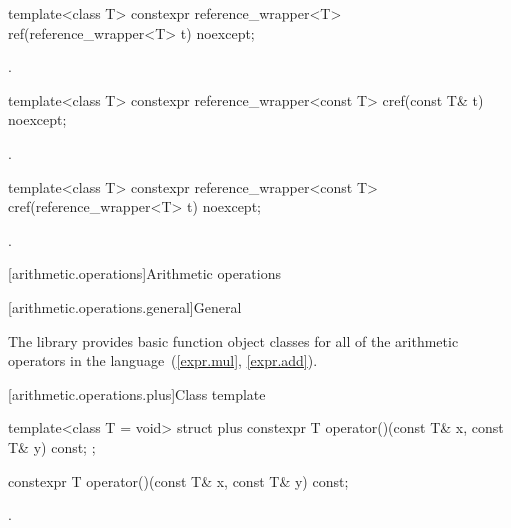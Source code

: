 %
\begin{itemdecl}
template<class T> constexpr reference_wrapper<T> ref(reference_wrapper<T> t) noexcept;
\end{itemdecl}

\begin{itemdescr}
\pnum
\returns
{}.
\end{itemdescr}

%
\begin{itemdecl}
template<class T> constexpr reference_wrapper<const T> cref(const T& t) noexcept;
\end{itemdecl}

\begin{itemdescr}
\pnum
\returns
{}.
\end{itemdescr}

%
\begin{itemdecl}
template<class T> constexpr reference_wrapper<const T> cref(reference_wrapper<T> t) noexcept;
\end{itemdecl}

\begin{itemdescr}
\pnum
\returns
{}.
\end{itemdescr}

[arithmetic.operations]{Arithmetic operations}

[arithmetic.operations.general]{General}

\pnum
The library provides basic function object classes for all of the arithmetic
operators in the language~(\ref{expr.mul}, \ref{expr.add}).

[arithmetic.operations.plus]{Class template }

%
\begin{itemdecl}
template<class T = void> struct plus {
  constexpr T operator()(const T& x, const T& y) const;
};
\end{itemdecl}

%
\begin{itemdecl}
constexpr T operator()(const T& x, const T& y) const;
\end{itemdecl}

\begin{itemdescr}
\pnum
\returns
{}.
\end{itemdescr}

